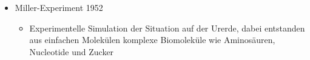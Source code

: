 \documentclass{article}
\begin{document}
\begin{itemize}
    \item Miller-Experiment 1952
        \begin{itemize}
            \item Experimentelle Simulation der Situation auf der Urerde, dabei entstanden aus einfachen Molekülen komplexe Biomoleküle wie Aminosäuren, Nucleotide und Zucker
        \end{itemize}
        
\end{itemize}
\end{document}
